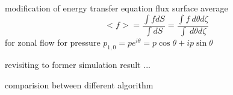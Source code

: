 \documentclass{beamer}
\begin{document}
\begin{frame}{modification of energy transfer equation}
	flux surface average
	\begin{equation}
		<f>=\frac{\int{f}dS}{\int{dS}}
		=\frac{\int{f}\ d\theta{d\zeta}}{\int\ d\theta{d\zeta}}
	\end{equation}
	for zonal flow 
	for pressure $p_{1,0}=pe^{i\theta}=p\cos\theta+ip\sin\theta$
	
\end{frame}
	


\begin{frame}{revisiting to former simulation result}
	...
\end{frame}


\begin{frame}{comparision between different algorithm}
	
\end{frame}
\end{document}
